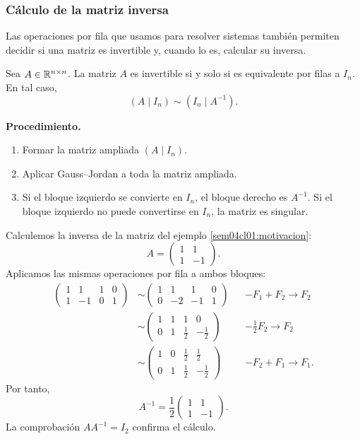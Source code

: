 \documentclass[compacto,10pt]{pubciencias-notas}
\begin{document}
\subsubsection{Cálculo de la matriz inversa}

Las operaciones por fila que usamos para resolver sistemas también permiten
decidir si una matriz es invertible y, cuando lo es, calcular su inversa.

\begin{teo}\label{sem04cl01:teo-calculo-inversa}
    Sea $A\in\Mat[\R]{n}{n}$. La matriz $A$ es invertible si y solo si es
    equivalente por filas a $I_n$. En tal caso,
    \[
        (A\mid I_n)\sim(I_n\mid A^{-1}).
    \]
\end{teo}

\noindent\textbf{Procedimiento.}
\begin{enumerate}
    \item Formar la matriz ampliada $(A\mid I_n)$.
    \item Aplicar Gauss--Jordan a toda la matriz ampliada.
    \item Si el bloque izquierdo se convierte en $I_n$, el bloque derecho es
          $A^{-1}$. Si el bloque izquierdo no puede convertirse en $I_n$, la
          matriz es singular.
\end{enumerate}

\begin{ejem}\label{sem04cl01:ej-inversa}
    Calculemos la inversa de la matriz del ejemplo
    \ref{sem04cl01:motivacion}:
    \[
        A=\begin{pmatrix}1&1\\1&-1\end{pmatrix}.
    \]
    Aplicamos las mismas operaciones por fila a ambos bloques:
    \begin{align*}
        \left(\begin{array}{cc|cc}1&1&1&0\\1&-1&0&1\end{array}\right)
        &\sim
        \left(\begin{array}{cc|cc}1&1&1&0\\0&-2&-1&1\end{array}\right)
        &&-F_1+F_2\to F_2\\
        &\sim
        \left(\begin{array}{cc|cc}1&1&1&0\\0&1&\frac12&-\frac12\end{array}\right)
        &&-\frac12F_2\to F_2\\
        &\sim
        \left(\begin{array}{cc|cc}1&0&\frac12&\frac12\\0&1&\frac12&-\frac12\end{array}\right)
        &&-F_2+F_1\to F_1.
    \end{align*}
    Por tanto,
    \[
        A^{-1}=\frac12\begin{pmatrix}1&1\\1&-1\end{pmatrix}.
    \]
    La comprobación $AA^{-1}=I_2$ confirma el cálculo.
\end{ejem}
\end{document}

